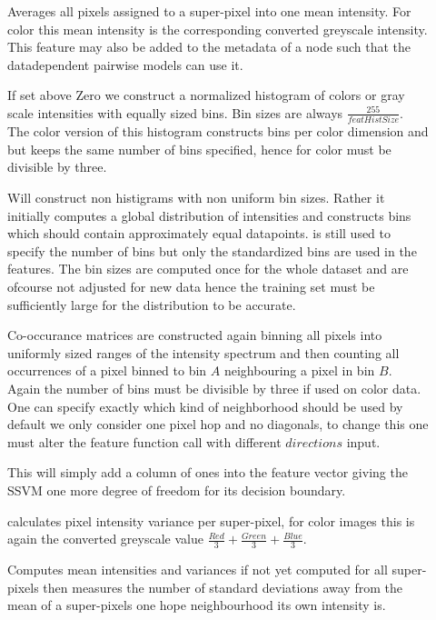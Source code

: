 \begin{description}
\item[] Averages all pixels assigned to a super-pixel into one mean intensity. For color this mean intensity is the corresponding converted greyscale intensity. This feature may also be added to the metadata of a node such that the datadependent pairwise models can use it.  
\item[] If set above Zero we construct a normalized histogram of colors or gray scale intensities with equally sized bins. Bin sizes are always $\frac{255}{featHistSize}$. The color version of this histogram constructs bins per color dimension and but keeps the same number of bins specified, hence for color  must be divisible by three.
\item[] Will construct non histigrams with non uniform bin sizes. Rather it initially computes a global distribution of intensities and constructs bins which should contain approximately equal datapoints.  is still used to specify the number of bins but only the standardized bins are used in the features. The bin sizes are computed once for the whole dataset and are ofcourse not adjusted for new data hence the training set must be sufficiently large for the distribution to be accurate. 
\item[] Co-occurance matrices are constructed again binning all pixels into uniformly sized ranges of the intensity spectrum and then counting all occurrences of a pixel binned to bin $A$ neighbouring a pixel in bin $B$. Again the number of bins must be divisible by three if used on color data. One can specify exactly which kind of neighborhood should be used by default we only consider one pixel hop and no diagonals, to change this one must alter the feature function call with different $directions$ input. 
\item[] This will simply add a column of ones into the feature vector giving the SSVM one more degree of freedom for its decision boundary. 
\item[] calculates pixel intensity variance per super-pixel, for color images this is again the converted greyscale value $\frac{Red}{3}+\frac{Green}{3}+\frac{Blue}{3}$. 
\item[] Computes mean intensities and variances if not yet computed for all super-pixels then measures the number of standard deviations away from the mean of a super-pixels one hope neighbourhood its own intensity is. 

\end{description}
